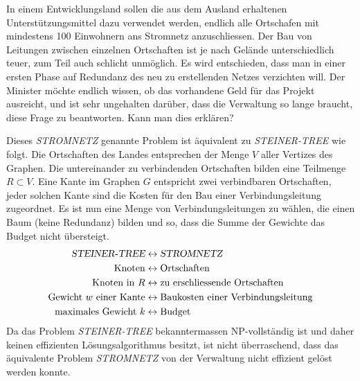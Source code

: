 In einem Entwicklungsland sollen die aus dem Ausland erhaltenen
Unterstützungsmittel dazu verwendet werden, endlich alle Ortschafen
mit mindestens 100 Einwohnern ans Stromnetz anzuschliessen.
Der Bau von Leitungen zwischen einzelnen Ortschaften ist je nach
Gelände unterschiedlich teuer, zum Teil auch schlicht unmöglich.
Es wird entschieden, dass man in einer ersten Phase auf Redundanz des
neu zu erstellenden Netzes verzichten will.
Der Minister möchte endlich wissen,
ob das vorhandene Geld für das Projekt ausreicht, und ist sehr ungehalten
darüber, dass die Verwaltung so lange braucht, diese Frage zu beantworten.
Kann man dies erklären?

\begin{loesung}
Dieses \textsl{STROMNETZ} genannte Problem ist äquivalent zu
\textsl{STEINER-TREE} wie folgt.
Die Ortschaften des Landes entsprechen der Menge $V$ aller Vertizes des
Graphen. Die untereinander zu verbindenden Ortschaften bilden eine Teilmenge
$R\subset V$.
Eine Kante im Graphen $G$ entspricht zwei verbindbaren Ortschaften,
jeder solchen Kante sind die Kosten für den Bau einer Verbindungsleitung
zugeordnet.
Es ist nun eine Menge von Verbindungsleitungen zu wählen, die einen Baum
(keine Redundanz) bilden und so, dass die Summe der Gewichte das 
Budget nicht übersteigt.
\begin{align*}
\textsl{STEINER-TREE}&\leftrightarrow\textsl{STROMNETZ}\\
\text{Knoten}&\leftrightarrow\text{Ortschaften}\\
\text{Knoten in $R$}&\leftrightarrow\text{zu erschliessende Ortschaften}\\
\text{Gewicht $w$ einer Kante}&\leftrightarrow \text{Baukosten einer Verbindungsleitung}\\
\text{maximales Gewicht $k$}&\leftrightarrow\text{Budget}
\end{align*}
Da das Problem \textsl{STEINER-TREE} bekanntermassen NP-vollständig ist
und daher keinen effizienten Lösungsalgorithmus besitzt, ist nicht
überraschend, dass das äquivalente Problem \textsl{STROMNETZ} von
der Verwaltung nicht effizient gelöst werden konnte.
\end{loesung}

